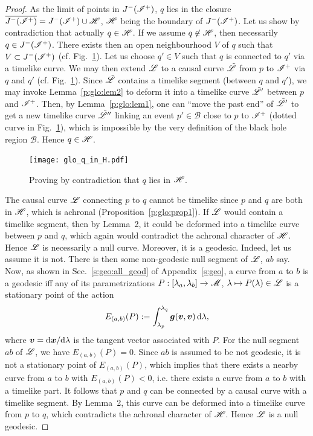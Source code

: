 \begin{proof}
As the limit of points in $J^-(\mathscr{I}^+)$, $q$ lies in the closure
$\overline{J^-(\mathscr{I}^+)} = J^-(\mathscr{I}^+) \cup \mathscr{H}$, $\mathscr{H}$
being the boundary of $J^-(\mathscr{I}^+)$.
Let us show by contradiction that actually $q\in\mathscr{H}$.
If we assume $q\not\in\mathscr{H}$, then necessarily $q\in J^-(\mathscr{I}^+)$.
There exists then an open neighbourhood $V$ of $q$ such that $V \subset  J^-(\mathscr{I}^+)$
(cf. Fig.~\ref{f:glo:q_in_H}).
Let us choose $q'\in V$ such that $q$ is connected to $q'$ via a timelike curve.
We may then extend $\mathscr{L}$ to a causal curve $\tilde{\mathscr{L}}$ from $p$ to $\mathscr{I}^+$
via $q$ and $q'$ (cf. Fig.~\ref{f:glo:q_in_H}). Since $\tilde{\mathscr{L}}$ contains a timelike segment
(between $q$ and $q'$), we may invoke Lemma~\ref{p:glo:lem2} to deform it into
a timelike curve $\tilde{\mathscr{L}}'$ between $p$ and $\mathscr{I}^+$. Then, by Lemma~\ref{p:glo:lem1},
one can ``move the past end'' of $\tilde{\mathscr{L}}'$
to get a new timelike curve $\tilde{\mathscr{L}}''$ linking an event $p'\in\mathscr{B}$ close
to $p$ to $\mathscr{I}^+$ (dotted curve in Fig.~\ref{f:glo:q_in_H}), which is impossible by the very definition of the black hole
region $\mathscr{B}$. Hence $q\in\mathscr{H}$.

\begin{figure}
\centerline{\texttt{[image: glo\_q\_in\_H.pdf]}}
\caption[]{\label{f:glo:q_in_H} \footnotesize
Proving by contradiction that $q$ lies in $\mathscr{H}$.}
\end{figure}


The causal curve $\mathscr{L}$ connecting $p$ to $q$ cannot be timelike since
$p$ and $q$ are both in $\mathscr{H}$, which is achronal (Proposition~\ref{p:glo:prop1}).
If $\mathscr{L}$ would contain a timelike segment, then by Lemma~2, it could
be deformed into a timelike curve between $p$ and $q$, which again would
contradict the achronal character of $\mathscr{H}$. Hence $\mathscr{L}$ is necessarily a null
curve. Moreover, it is a geodesic. Indeed, let us assume it is not.
There is then some non-geodesic null segment of $\mathscr{L}$, $ab$ say. Now, as shown in Sec.~\ref{s:geo:all_geod} of Appendix~\ref{s:geo},
a curve from $a$ to $b$ is a geodesic iff any of its parametrizations
$P: [\lambda_a,\lambda_b] \rightarrow \mathscr{M}$, $\lambda \mapsto P(\lambda)\in\mathscr{L}$
is a stationary point of the action
\[
    E_{(a,b)}(P) := \int_{\lambda_p}^{\lambda_q}
        \bm{g}(\bm{v}, \bm{v})  \, \mathrm{d}\lambda ,
\]
where $\bm{v} = \mathrm{d}\bm{x}/\mathrm{d}\lambda$ is the tangent vector
associated with $P$. For the null segment $ab$ of $\mathscr{L}$, we have
$E_{(a,b)}(P)=0$. Since $ab$ is assumed to be not geodesic, it is not a
stationary point of $E_{(a,b)}(P)$, which
implies that there exists a nearby curve from $a$ to $b$ with $E_{(a,b)}(P)<0$,
i.e. there exists a curve from $a$ to $b$ with a timelike part.
It follows that $p$ and $q$ can be connected
by a causal curve with a timelike segment. By Lemma~2, this curve can be
deformed into a timelike curve from $p$ to $q$, which contradicts
the achronal character of $\mathscr{H}$. Hence $\mathscr{L}$ is a null geodesic.


\end{proof}

